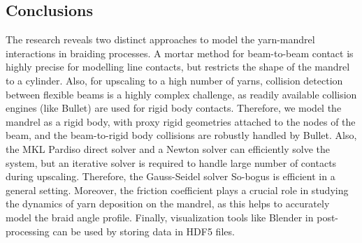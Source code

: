 \subsection{Conclusions}
The research reveals two distinct approaches to model the yarn-mandrel interactions in braiding processes. A mortar method for beam-to-beam contact is highly precise for modelling line contacts, but restricts the shape of the mandrel to a cylinder. Also, for upscaling to a high number of yarns, collision detection between flexible beams is a highly complex challenge, as readily available collision engines (like Bullet) are used for rigid body contacts. Therefore, we model the mandrel as a rigid body, with proxy rigid geometries attached to the nodes of the beam, and the beam-to-rigid body collisions are robustly handled by Bullet. Also, the MKL Pardiso direct solver and a Newton solver can efficiently solve the system, but an iterative solver is required to handle large number of contacts during upscaling. Therefore, the Gauss-Seidel solver So-bogus is efficient in a general setting. Moreover, the friction coefficient plays a crucial role in studying the dynamics of yarn deposition on the mandrel, as this helps to accurately model the braid angle profile. Finally, visualization tools like Blender in post-processing can be used by storing data in HDF5 files.




